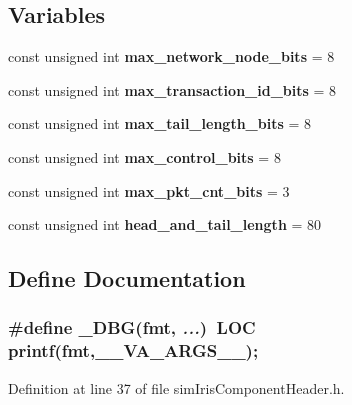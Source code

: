 \subsection*{Variables}
\begin{CompactItemize}
\item 
const unsigned int {\bf max\_\-network\_\-node\_\-bits} = 8
\item 
const unsigned int {\bf max\_\-transaction\_\-id\_\-bits} = 8
\item 
const unsigned int {\bf max\_\-tail\_\-length\_\-bits} = 8
\item 
const unsigned int {\bf max\_\-control\_\-bits} = 8
\item 
const unsigned int {\bf max\_\-pkt\_\-cnt\_\-bits} = 3
\item 
const unsigned int {\bf head\_\-and\_\-tail\_\-length} = 80
\end{CompactItemize}


\subsection{Define Documentation}
\subsubsection[{\_\-DBG}]{\setlength{\rightskip}{0pt plus 5cm}\#define \_\-DBG(fmt, \/   {\em ...})~LOC printf(fmt,\_\-\_\-VA\_\-ARGS\_\-\_\-);}\label{simIrisComponentHeader_8h_db8be0abb314b4cd0da20a9aa45a473e}




Definition at line 37 of file simIrisComponentHeader.h.

